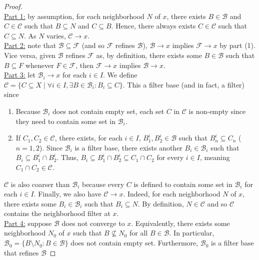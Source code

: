 \documentclass{treatise}
\begin{document}
\begin{proof} \ \\
\underline{Part 1:} by assumption, for each neighborhood $N$ of $x$, there exists $B \in \mathcal{B}$ and $C \in \mathcal{C}$ such that $B \subseteq N$ and $C \subseteq B$. Hence, there always exists $C \in \mathcal{C}$ such that $C \subseteq N$. As $N$ varies, $\mathcal{C} \to x$.
\\
\underline{Part 2:} note that $\mathcal{B} \subseteq \mathcal{F}$ (and so $\mathcal{F}$ refines $\mathcal{B}$), $\mathcal{B} \to x$ implies $\mathcal{F} \to x$ by part (1). Vice versa, given $\mathcal{B}$ refines $\mathcal{F}$ as, by definition, there exists some $B \in \mathcal{B}$ such that $B \subseteq F$ whenever $F \in \mathcal{F}$, then $\mathcal{F} \to x$ implies $\mathcal{B} \to x$.
\\
\underline{Part 3:} let $\mathcal{B}_i \to x$ for each $i \in I$. We define $\mathcal{C} = \{ C \subseteq X \mid \forall i \in I, \exists B \in \mathcal{B}_i : B_i \subseteq C \}$. This a filter base (and in fact, a filter) since
\begin{enumerate}
    \item Because $\mathcal{B}_i$ does not contain empty set, each set $C$ in $\mathcal{C}$ is non-empty since they need to contain some set in $\mathcal{B}_i$.
    \item If $C_1, C_2 \in \mathcal{C}$, there exists, for each $i \in I$, $B_1^i, B_2^i \in \mathcal{B}$ such that $B_n^i \subseteq C_n$ ($n = 1, 2$). Since $\mathcal{B}_i$ is a filter base, there exists another $B_i \in \mathcal{B}_i$ such that $B_i \subseteq B_1^i \cap B_2^i$. Thus, $B_i \subseteq B_1^i \cap B_2^i \subseteq C_1 \cap C_2$ for every $i \in I$, meaning $C_1 \cap C_2 \in \mathcal{C}$.
\end{enumerate}
$\mathcal{C}$ is also coarser than $\mathcal{B}_i$ because every $C$ is defined to contain some set in $\mathcal{B}_i$ for each $i \in I$. Finally, we also have $\mathcal{C} \to x$. Indeed, for each neighborhood $N$ of $x$, there exists some $B_i \in \mathcal{B}_i$ such that $B_i \subseteq N$. By definition, $N \in \mathcal{C}$ and so $\mathcal{C}$ contains the neighborhood filter at $x$.
\\
\underline{Part 4:} suppose $\mathcal{B}$ does not converge to $x$. Equivalently, there exists some neighborhood $N_0$ of $x$ such that $B \not\subseteq N_0$ for all $B \in \mathcal{B}$. In particular, $\mathcal{B}_0 = \{ B \setminus N_0 : B \in \mathcal{B} \}$ does not contain empty set. Furthermore, $\mathcal{B}_0$ is a filter base that refines $\mathcal{B}$

\end{proof}
\end{document}
